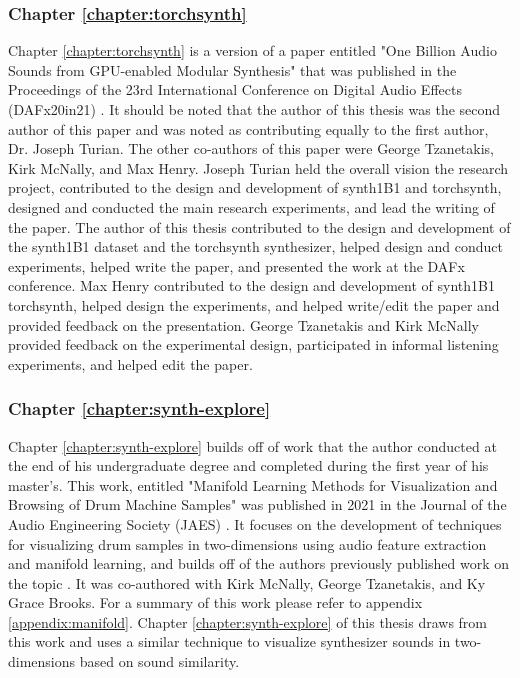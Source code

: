 \subsubsection{Chapter \ref{chapter:torchsynth}}
Chapter \ref{chapter:torchsynth} is a version of a paper entitled "One Billion Audio Sounds from GPU-enabled Modular Synthesis" that was published in the Proceedings of the 23rd International Conference on Digital Audio Effects (DAFx20in21) \cite{turian2021one}. It should be noted that the author of this thesis was the second author of this paper and was noted as contributing equally to the first author, Dr. Joseph Turian. The other co-authors of this paper were George Tzanetakis, Kirk McNally, and Max Henry. Joseph Turian held the overall vision the research project, contributed to the design and development of synth1B1 and torchsynth, designed and conducted the main research experiments, and lead the writing of the paper. The author of this thesis contributed to the design and development of the synth1B1 dataset and the torchsynth synthesizer, helped design and conduct experiments, helped write the paper, and presented the work at the DAFx conference. Max Henry contributed to the design and development of synth1B1 torchsynth, helped design the experiments, and helped write/edit the paper and provided feedback on the presentation. George Tzanetakis and Kirk McNally provided feedback on the experimental design, participated in informal listening experiments, and helped edit the paper.

\subsubsection{Chapter \ref{chapter:synth-explore}}
Chapter \ref{chapter:synth-explore} builds off of work that the author conducted at the end of his undergraduate degree and completed during the first year of his master's. This work, entitled "Manifold Learning Methods for Visualization and Browsing of Drum Machine Samples" was published in 2021 in the Journal of the Audio Engineering Society (JAES) \cite{shier2021manifold}. It focuses on the development of techniques for visualizing drum samples in two-dimensions using audio feature extraction and manifold learning, and builds off of the authors previously published work on the topic \cite{shier2017analysis, shier2017sieve}. It was co-authored with Kirk McNally, George Tzanetakis, and Ky Grace Brooks. For a summary of this work please refer to appendix \ref{appendix:manifold}. Chapter \ref{chapter:synth-explore} of this thesis draws from this work and uses a similar technique to visualize synthesizer sounds in two-dimensions based on sound similarity.

